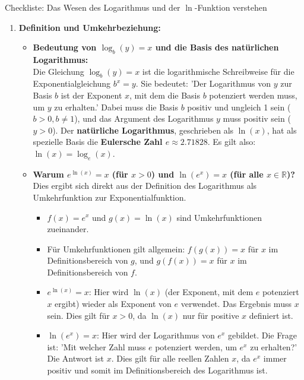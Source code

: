 \begin{loesungsumgebung}{Checkliste: Das Wesen des Logarithmus und der $\ln$-Funktion verstehen}

\begin{enumerate}[label=(\alph*)]
    \item \textbf{Definition und Umkehrbeziehung:}
    \begin{itemize}
        \item \textbf{Bedeutung von $\log_b(y)=x$ und die Basis des natürlichen Logarithmus:} \\
        Die Gleichung $\log_b(y)=x$ ist die logarithmische Schreibweise für die Exponentialgleichung $b^x = y$. Sie bedeutet: 'Der Logarithmus von $y$ zur Basis $b$ ist der Exponent $x$, mit dem die Basis $b$ potenziert werden muss, um $y$ zu erhalten.' Dabei muss die Basis $b$ positiv und ungleich 1 sein ($b>0, b \neq 1$), und das Argument des Logarithmus $y$ muss positiv sein ($y>0$).
        Der \textbf{natürliche Logarithmus}, geschrieben als $\ln(x)$, hat als spezielle Basis die \textbf{Eulersche Zahl $e \approx 2.71828$}. Es gilt also: $\ln(x) = \log_e(x)$.

        \item \textbf{Warum $e^{\ln(x)} = x$ (für $x>0$) und $\ln(e^x) = x$ (für alle $x \in \mathbb{R}$)?} \\
        Dies ergibt sich direkt aus der Definition des Logarithmus als Umkehrfunktion zur Exponentialfunktion.
        \begin{itemize}
            \item $f(x)=e^x$ und $g(x)=\ln(x)$ sind Umkehrfunktionen zueinander.
            \item Für Umkehrfunktionen gilt allgemein: $f(g(x))=x$ für $x$ im Definitionsbereich von $g$, und $g(f(x))=x$ für $x$ im Definitionsbereich von $f$.
            \item $e^{\ln(x)} = x$: Hier wird $\ln(x)$ (der Exponent, mit dem $e$ potenziert $x$ ergibt) wieder als Exponent von $e$ verwendet. Das Ergebnis muss $x$ sein. Dies gilt für $x>0$, da $\ln(x)$ nur für positive $x$ definiert ist.
            \item $\ln(e^x) = x$: Hier wird der Logarithmus von $e^x$ gebildet. Die Frage ist: 'Mit welcher Zahl muss $e$ potenziert werden, um $e^x$ zu erhalten?' Die Antwort ist $x$. Dies gilt für alle reellen Zahlen $x$, da $e^x$ immer positiv und somit im Definitionsbereich des Logarithmus ist.
        \end{itemize}


\end{itemize}
\end{enumerate}
\end{loesungsumgebung}
